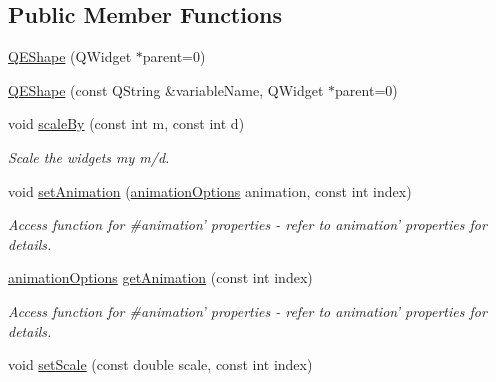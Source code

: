 \subsection*{Public Member Functions}
\begin{DoxyCompactItemize}
\item 
\hyperlink{classQEShape_acbef31756938dad9d21719a61aa232b7}{QEShape} (QWidget $\ast$parent=0)
\item 
\hyperlink{classQEShape_a4161577fbe51bbb3bc7e1d093d62eedb}{QEShape} (const QString \&variableName, QWidget $\ast$parent=0)
\item 
\hypertarget{classQEShape_aa6ac6986e028de5e259eea025b4ee037}{
void \hyperlink{classQEShape_aa6ac6986e028de5e259eea025b4ee037}{scaleBy} (const int m, const int d)}
\label{classQEShape_aa6ac6986e028de5e259eea025b4ee037}

\begin{DoxyCompactList}\small\item\em Scale the widgets my m/d. \end{DoxyCompactList}\item 
\hypertarget{classQEShape_a9a66d1e5dea51eac818d87b787528465}{
void \hyperlink{classQEShape_a9a66d1e5dea51eac818d87b787528465}{setAnimation} (\hyperlink{classQEShape_ae817ce1f72776774184d545dca59eec2}{animationOptions} animation, const int index)}
\label{classQEShape_a9a66d1e5dea51eac818d87b787528465}

\begin{DoxyCompactList}\small\item\em Access function for \#animation' properties -\/ refer to animation' properties for details. \end{DoxyCompactList}\item 
\hypertarget{classQEShape_a58d2dbe6df451c3007a3242d42e6c82b}{
\hyperlink{classQEShape_ae817ce1f72776774184d545dca59eec2}{animationOptions} \hyperlink{classQEShape_a58d2dbe6df451c3007a3242d42e6c82b}{getAnimation} (const int index)}
\label{classQEShape_a58d2dbe6df451c3007a3242d42e6c82b}

\begin{DoxyCompactList}\small\item\em Access function for \#animation' properties -\/ refer to animation' properties for details. \end{DoxyCompactList}\item 
\hypertarget{classQEShape_a20e2dfe9f078a6e6ff18e720ea5fb83e}{
void \hyperlink{classQEShape_a20e2dfe9f078a6e6ff18e720ea5fb83e}{setScale} (const double scale, const int index)}
\label{classQEShape_a20e2dfe9f078a6e6ff18e720ea5fb83e}


\end{DoxyCompactItemize}
